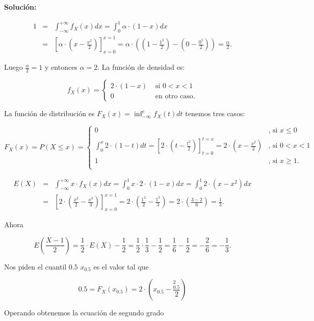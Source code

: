 \documentclass[12pt]{article}\usepackage[]{graphicx}\usepackage[]{color}
\renewcommand{\leq}{\leqslant}
\renewcommand{\geq}{\geqslant}
\begin{document}
\textbf{Solución:}



\begin{eqnarray*}
1 &=&\displaystyle \int_{-\infty}^{+\infty} f_X(x) dx=\int_{0}^1 \alpha\cdot (1-x) dx\\
&=& \left[\alpha\cdot \left(x-\frac{x^2}{2}\right)\right]_{x=0}^{x=1}= \alpha\cdot \left(\left(1-\frac{1^2}{2}\right)-\left(0-\frac{0^2}{2}\right)\right)=\frac{\alpha}{2}.
\end{eqnarray*}

Luego $\frac{\alpha}{2}=1$ y entonces $\alpha=2.$ La función de densidad es:

$$
f_X(x)=\left\{
\begin{array}{ll}
2 \cdot (1-x)  & \mbox{ si } 0 < x < 1 \\
0 & \mbox{ en otro caso.}
\end{array}
\right.
$$


La función de distribución es $F_X(x)=\inf_{-\infty}^c f_X(t) dt$ tenemos tres casos:



$$
F_X(x)=P(X\leq x)=\left\{
\begin{array}{ll}
0 & \mbox{, si } x\leq 0 \\
\int_{0}^{x} 2\cdot(1-t) dt =\left[2\cdot \left(t-\frac{t^2}{2}\right)\right]_{t=0}^{t=x}
= 2\cdot \left(x-\frac{x^2}{2}\right) & \mbox{, si } 0<x<1 \\
1 & \mbox{, si } x\geq 1 .\\
\end{array}
\right.
$$


\begin{eqnarray*}
E(X)&=&\int_{-\infty}^{+\infty} x\cdot f_X(x) dx=\int_{0}^{1} x\cdot 2\cdot (1-x) dx=
\int_{0}^{1} 2\cdot (x-x^2) dx\\
&=& \left[2\cdot \left(\frac{x^2}{2}-\frac{x^3}{3}\right) \right]_{x=0}^{x=1}= 2\cdot \left(\frac{1^2}{2}-\frac{1^3}{3}\right)=2\cdot \left(\frac{3-2}{6}\right)=\frac13.
\end{eqnarray*}


Ahora 

$$E\left(\frac{X-1}{2}\right)=\frac{1}{2}\cdot E(X)-\frac{1}{2}= \frac{1}{2}\cdot \frac13-\frac{1}{2}=\frac16-\frac12=-\frac26=-\frac13.$$

Nos piden el cuantil $0.5$ $x_0.5$ es el valor tal que 

$$0.5=F_X(x_{0.5})=2\cdot \left(x_{0.5}-\frac{_{0.5}^2}{2}\right)$$

Operando obtenemos la ecuación de segundo grado 
\end{document}
